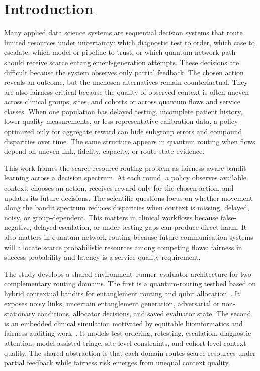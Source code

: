 \documentclass[conference]{IEEEtran}
\begin{document}
\section{Introduction}
Many applied data science systems are sequential decision systems that route
limited resources under uncertainty: which diagnostic test to order, which case
to escalate, which model or pipeline to trust, or which quantum-network path
should receive scarce entanglement-generation attempts. These decisions are
difficult because the system observes only partial feedback. The chosen action
reveals an outcome, but the unchosen alternatives remain counterfactual. They
are also fairness critical because the quality of observed context is often
uneven across clinical groups, sites, and cohorts or across quantum flows and
service classes. When one population has delayed testing, incomplete patient
history, lower-quality measurements, or less representative calibration data,
a policy optimized only for aggregate reward can hide subgroup errors and
compound disparities over time. The same structure appears in quantum routing
when flows depend on uneven link, fidelity, capacity, or route-state evidence.

This work frames the scarce-resource routing problem as fairness-aware bandit
learning across a decision spectrum. At each round, a policy observes available
context, chooses an action, receives reward only for the chosen action, and
updates its future decisions. The scientific questions focus on whether
movement along the bandit spectrum reduces disparities when context is
missing, delayed, noisy, or group-dependent. This matters in clinical workflows
because false-negative, delayed-escalation, or under-testing gaps can produce
direct harm. It also matters in quantum-network routing because future
communication systems will allocate scarce probabilistic resources among
competing flows; fairness in success probability and latency is a
service-quality requirement.

The study develops a shared environment--runner--evaluator architecture for
two complementary routing domains. The first is a quantum-routing testbed
based on hybrid contextual bandits for entanglement routing and qubit
allocation~\cite{garcia2026threat_aware_quantum_routing}. It exposes noisy
links, uncertain entanglement generation, adversarial or non-stationary
conditions, allocator decisions, and saved evaluator state. The second is an
embedded clinical simulation motivated by equitable bioinformatics and
fairness auditing work~\cite{garcia2025equitable_bioinformatics}. It models
test ordering, retesting, escalation, diagnostic attention, model-assisted
triage, site-level constraints, and cohort-level context quality. The shared
abstraction is that each domain routes scarce resources under partial feedback
while fairness risk emerges from unequal context quality.
\end{document}
